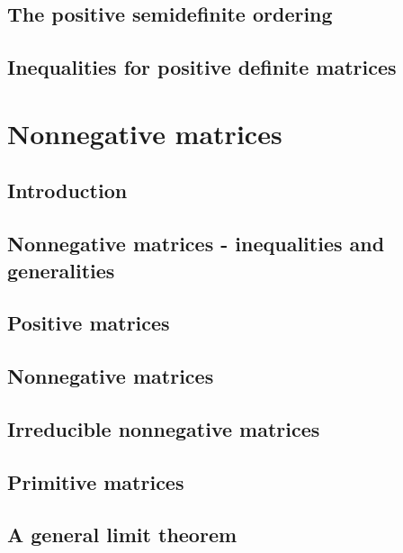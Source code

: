 \documentclass[a4paper]{article}
\newcommand{\todobox}{\textcolor{red}{\fbox{\phantom{--}}}}
\begin{document}
\subsection{The positive semidefinite ordering}
\todobox
\subsection{Inequalities for positive definite matrices}
\todobox
\newpage
\section{Nonnegative matrices}
\setcounter{subsection}{-1}
\subsection{Introduction}
\todobox
\subsection{Nonnegative matrices - inequalities and generalities}
\todobox
\subsection{Positive matrices}
\todobox
\subsection{Nonnegative matrices}
\todobox
\subsection{Irreducible nonnegative matrices}
\todobox
\subsection{Primitive matrices}
\todobox
\subsection{A general limit theorem}
\todobox
\end{document}
